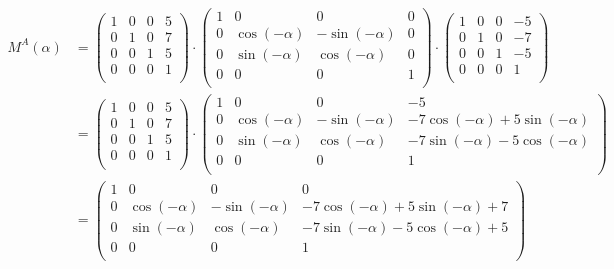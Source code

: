 \documentclass[a4paper,10pt,DIV=14]{scrartcl}
\begin{document}
\begin{align*}
M^A(\alpha) & = \begin{pmatrix}
					1 & 0 & 0 & 5 \\
					0 & 1 & 0 & 7 \\
					0 & 0 & 1 & 5 \\
					0 & 0 & 0 & 1 \\
				\end{pmatrix} \cdot
				\begin{pmatrix}
					1 & 0             & 0              & 0 \\
					0 & \cos(-\alpha) & -\sin(-\alpha) & 0 \\
					0 & \sin(-\alpha) & \cos(-\alpha)  & 0 \\
					0 & 0             & 0              & 1 \\
				\end{pmatrix} \cdot
				\begin{pmatrix}
					1 & 0 & 0 & -5 \\
					0 & 1 & 0 & -7 \\
					0 & 0 & 1 & -5 \\
					0 & 0 & 0 & 1  \\
				\end{pmatrix} \\
			& = \begin{pmatrix}
					1 & 0 & 0 & 5 \\
					0 & 1 & 0 & 7 \\
					0 & 0 & 1 & 5 \\
					0 & 0 & 0 & 1 \\
				\end{pmatrix} \cdot
				\begin{pmatrix}
					1 & 0             & 0              & -5                               \\
					0 & \cos(-\alpha) & -\sin(-\alpha) & -7\cos(-\alpha) + 5\sin(-\alpha)  \\
					0 & \sin(-\alpha) & \cos(-\alpha)  & -7\sin(-\alpha) - 5\cos(-\alpha) \\
					0 & 0             & 0              & 1                                \\
				\end{pmatrix} \\
			& = \begin{pmatrix}
					1 & 0             & 0              & 0                                    \\
					0 & \cos(-\alpha) & -\sin(-\alpha) & -7\cos(-\alpha) + 5\sin(-\alpha) + 7  \\
					0 & \sin(-\alpha) & \cos(-\alpha)  & -7\sin(-\alpha) - 5\cos(-\alpha) + 5 \\
					0 & 0             & 0              & 1                                    \\
				\end{pmatrix}
\end{align*}
\end{document}
